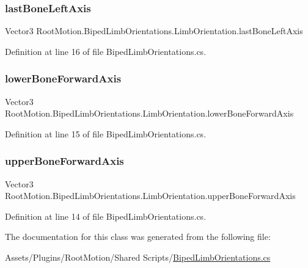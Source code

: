 \subsubsection{\texorpdfstring{last\+Bone\+Left\+Axis}{lastBoneLeftAxis}}
{\footnotesize\ttfamily Vector3 Root\+Motion.\+Biped\+Limb\+Orientations.\+Limb\+Orientation.\+last\+Bone\+Left\+Axis}



Definition at line 16 of file Biped\+Limb\+Orientations.\+cs.

\mbox{\label{class_root_motion_1_1_biped_limb_orientations_1_1_limb_orientation_a63ada7fad803287f5d2745c2c86b773d}} 
\subsubsection{\texorpdfstring{lower\+Bone\+Forward\+Axis}{lowerBoneForwardAxis}}
{\footnotesize\ttfamily Vector3 Root\+Motion.\+Biped\+Limb\+Orientations.\+Limb\+Orientation.\+lower\+Bone\+Forward\+Axis}



Definition at line 15 of file Biped\+Limb\+Orientations.\+cs.

\mbox{\label{class_root_motion_1_1_biped_limb_orientations_1_1_limb_orientation_a885c8197a74dfe72c4fbec18070201b6}} 
\subsubsection{\texorpdfstring{upper\+Bone\+Forward\+Axis}{upperBoneForwardAxis}}
{\footnotesize\ttfamily Vector3 Root\+Motion.\+Biped\+Limb\+Orientations.\+Limb\+Orientation.\+upper\+Bone\+Forward\+Axis}



Definition at line 14 of file Biped\+Limb\+Orientations.\+cs.



The documentation for this class was generated from the following file\+:\begin{DoxyCompactItemize}
\item 
Assets/\+Plugins/\+Root\+Motion/\+Shared Scripts/\mbox{\hyperlink{_biped_limb_orientations_8cs}{Biped\+Limb\+Orientations.\+cs}}\end{DoxyCompactItemize}
